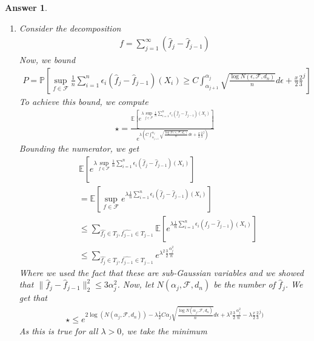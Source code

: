 \documentclass[12pt]{article}
\theoremstyle{colon}
\newtheorem*{answer}{Answer}
\begin{document}
\begin{answer}
\begin{enumerate}[label=\arabic*)]
    \item Consider the decomposition
      \begin{gather*}
        f = \sum_{j=1}^\infty (\hat{f}_j - \hat{f}_{j-1})
      \end{gather*}
      Now, we bound
      \begin{gather*}
        P = \mathbb{P} \left[ \sup_{f \in \mathcal{F}} \frac{1}{n} \sum_{i=1}^n \epsilon_i (\hat{f}_j - \hat{f}_{j-1})(X_i) \geq C \int_{\alpha_{j+1}}^{\alpha_j} \sqrt{\frac{\log N(\epsilon, \mathcal{F}, d_n)}{n}} d\epsilon + \frac{x}{2} \frac{2}{3}^j \right]
      \end{gather*}
      To achieve this bound, we compute
      \begin{gather*}
        \star = \frac{\mathbb{E}[e^{\lambda \sup_{f \in \mathcal{F}} \frac{1}{n} \sum_{i=1}^n \epsilon_i (\hat{f}_j - \hat{f}_{j-1})(X_i)}]}{e^{\lambda(C \int_{\alpha_{j+1}}^{\alpha_j} \sqrt{\frac{\log N(\epsilon, \mathcal{F}, d_n)}{n}} d\epsilon + \frac{x}{2} \frac{2}{3}^j)}}
      \end{gather*}
      Bounding the numerator, we get
      \begin{align*}
        &\mathbb{E}[e^{\lambda \sup_{f \in \mathcal{F}} \frac{1}{n} \sum_{i=1}^n \epsilon_i (\hat{f}_j - \hat{f}_{j-1})(X_i)}] \\
        &= \mathbb{E}[\sup_{f \in \mathcal{F}} e^{\lambda \frac{1}{n} \sum_{i=1}^n \epsilon_i (\hat{f}_j - \hat{f}_{j-1})(X_i)}] \\
        &\leq \sum_{\hat{f_j} \in T_j, \hat{f_{j-1}} \in T_{j-1}} \mathbb{E}[ e^{\lambda \frac{1}{n} \sum_{i=1}^n \epsilon_i (\hat{f}_j - \hat{f}_{j-1})(X_i)}] \\
        &\leq \sum_{\hat{f_j} \in T_j, \hat{f_{j-1}} \in T_{j-1}} e^{\lambda^2 \frac{3}{2} \frac{\alpha_j^2}{n}}
      \end{align*}
      Where we used the fact that these are sub-Gaussian variables and we showed that $\lVert \hat{f}_j - \hat{f}_{j-1} \rVert_2^2 \leq 3 \alpha_j^2$. Now, let $N(\alpha_j, \mathcal{F}, d_n)$ be the number of $\hat{f}_j$. We get that
      \begin{gather*}
        \star \leq e^{2 \log(N(\alpha_j, \mathcal{F}, d_n)) - \lambda \frac{1}{2} C \alpha_j \sqrt{\frac{\log N(\alpha_j, \mathcal{F}, d_n)}{n}} d\epsilon + \lambda^2 \frac{3}{2} \frac{\alpha_j^2}{n} - \lambda \frac{x}{2} \frac{2}{3}^j) }
      \end{gather*}
      As this is true for all $\lambda > 0$, we take the minimum
      \begin{gather*}

\end{gather*}
\end{enumerate}
\end{answer}
\end{document}

